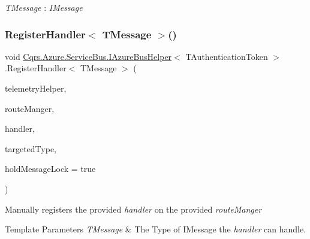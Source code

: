 \begin{Desc}
\item[Type Constraints]\begin{description}
\item[{\em T\+Message} : {\em I\+Message}]\end{description}
\end{Desc}
\mbox{\label{interfaceCqrs_1_1Azure_1_1ServiceBus_1_1IAzureBusHelper_a1fe0ff74b4e5cce3d0b5a81dbaa273e0_a1fe0ff74b4e5cce3d0b5a81dbaa273e0}} 
\subsubsection{\texorpdfstring{Register\+Handler$<$ T\+Message $>$()}{RegisterHandler< TMessage >()}}
{\footnotesize\ttfamily void \hyperlink{interfaceCqrs_1_1Azure_1_1ServiceBus_1_1IAzureBusHelper}{Cqrs.\+Azure.\+Service\+Bus.\+I\+Azure\+Bus\+Helper}$<$ T\+Authentication\+Token $>$.Register\+Handler$<$ T\+Message $>$ (\begin{DoxyParamCaption}\item[{I\+Telemetry\+Helper}]{telemetry\+Helper,  }\item[{\hyperlink{classCqrs_1_1Bus_1_1RouteManager}{Route\+Manager}}]{route\+Manger,  }\item[{Action$<$ T\+Message $>$}]{handler,  }\item[{Type}]{targeted\+Type,  }\item[{bool}]{hold\+Message\+Lock = {\ttfamily true} }\end{DoxyParamCaption})}



Manually registers the provided {\itshape handler}  on the provided {\itshape route\+Manger}  


\begin{DoxyTemplParams}{Template Parameters}
{\em T\+Message} & The Type of I\+Message the {\itshape handler}  can handle.\\
\hline
\end{DoxyTemplParams}


